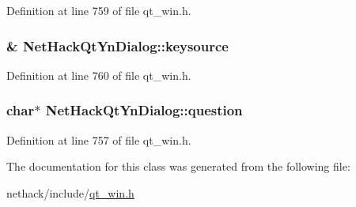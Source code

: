 Definition at line 759 of file qt\+\_\+win.\+h.

\hypertarget{classNetHackQtYnDialog_a67f46f40a36ccf10f4209cbd6d5f85d8}{
\subsubsection[{keysource}]{\& Net\+Hack\+Qt\+Yn\+Dialog\+::keysource\hspace{0.3cm}{\ttfamily [private]}}}\label{classNetHackQtYnDialog_a67f46f40a36ccf10f4209cbd6d5f85d8}


Definition at line 760 of file qt\+\_\+win.\+h.

\hypertarget{classNetHackQtYnDialog_a070df1acd95c97d94cf6051924fd178a}{
\subsubsection[{question}]{ char$\ast$ Net\+Hack\+Qt\+Yn\+Dialog\+::question\hspace{0.3cm}{\ttfamily [private]}}}\label{classNetHackQtYnDialog_a070df1acd95c97d94cf6051924fd178a}


Definition at line 757 of file qt\+\_\+win.\+h.



The documentation for this class was generated from the following file\+:\begin{DoxyCompactItemize}
\item 
nethack/include/\hyperlink{qt__win_8h}{qt\+\_\+win.\+h}\end{DoxyCompactItemize}
